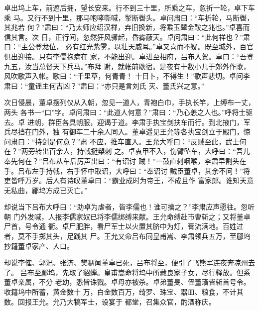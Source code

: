 卓出坞上车，前遮后拥，望长安来。行不到三十里，所乘之车，忽折一轮，卓下车乘
马。又行不到十里，那马咆哮嘶喊，掣断辔头。卓问肃曰：“车折轮，马断辔，其兆若
何？”肃曰：“乃太师应绍汉禅，弃旧换新，将乘玉辇金鞍之兆也。”卓喜而信其言。次
日，正行间，忽然狂风骤起，昏雾蔽天。卓问肃曰：“此何祥也？”肃曰：“主公登龙位，
必有红光紫雾，以壮天威耳。”卓又喜而不疑。既至城外，百官俱出迎接。只有李儒抱病在
家，不能出迎。卓进至相府，吕布入贺。卓曰：“吾登九五，汝当总督天下兵马。”布拜
谢，就帐前歇宿。是夜有十数小儿于郊外作歌，风吹歌声入帐。歌曰：“千里草，何青青！
十日卜，不得生！”歌声悲切。卓问李肃曰：“童谣主何吉凶？”肃曰：“亦只是言刘氏
灭、董氏兴之意。”

次日侵晨，董卓摆列仪从入朝，忽见一道人，青袍白巾，手执长竿，上缚布一丈，两头
各书一“口”字。卓问肃曰：“此道人何意？”肃曰：“乃心恙之人也。”呼将士驱去。卓
进朝，群臣各具朝服，迎谒于道。李肃手执宝剑扶车而行。到北掖门，军兵尽挡在门外，独
有御车二十余人同入。董卓遥见王允等各执宝剑立于殿门，惊问肃曰：“持剑是何意？”肃
不应，推车直入。王允大呼曰：“反贼至此，武士何在？”两旁转出百余人，持戟挺槊刺
之。卓衷甲不入，伤臂坠车，大呼曰：“吾儿奉先何在？”吕布从车后厉声出曰：“有诏讨
贼！”一鼓直刺咽喉，李肃早割头在手。吕布左手持戟，右手怀中取诏，大呼曰：“奉诏讨
贼臣董卓，其余不问！”将吏皆呼万岁。后人有诗叹董卓曰：“霸业成时为帝王，不成且作
富家郎。谁知天意无私曲，郿坞方成已灭亡。”

却说当下吕布大呼曰：“助卓为虐者，皆李儒也！谁可擒之？”李肃应声愿往。忽听朝
门外发喊，人报李儒家奴已将李儒绑缚来献。王允命缚赴市曹斩之；又将董卓尸首，号令通
衢。卓尸肥胖，看尸军士以火置其脐中为灯，膏流满地。百姓过者，莫不手掷其头，足践其
尸。王允又命吕布同皇甫嵩、李肃领兵五万，至郿坞抄籍董卓家产、人口。

却说李傕、郭汜、张济、樊稠闻董卓已死，吕布将至，便引了飞熊军连夜奔凉州去了。
吕布至郿坞，先取了貂蝉。皇甫嵩命将坞中所藏良家子女，尽行释放。但系董卓亲属，不分
老幼，悉皆诛戮。卓母亦被杀。卓弟董旻、侄董璜皆斩首号令。收籍坞中所蓄，黄金数十
万，白金数百万，绮罗、珠宝、器皿、粮食，不计其数。回报王允。允乃大犒军士，设宴于
都堂，召集众官，酌酒称庆。

